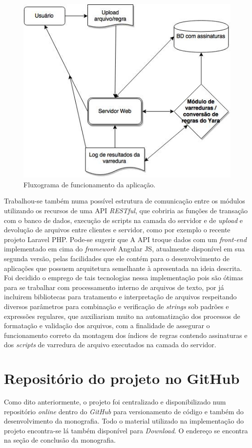 \begin{figure}[H]
  \includegraphics[scale=0.6]{figs/flux_prototipo}
  \centering
  \caption{Fluxograma de funcionamento da aplicação.}
  \label{f.flux_prototipo}
\end{figure}

Trabalhou-se também numa possível estrutura de comunicação entre os módulos
utilizando os recursos de uma API \textit{RESTful}, que cobriria as funções de
transação com o banco de dados, execução de scripts na camada do servidor e de
\textit{upload} e devolução de arquivos entre clientes e servidor, como por
exemplo o recente projeto Laravel PHP. Pode-se sugerir que A API troque dados
com um \textit{front-end} implementado em cima do \textit{framework} Angular JS,
atualmente disponível em sua segunda versão, pelas facilidades que ele contém
para o desenvolvimento de aplicações que possuem arquitetura semelhante à
apresentada na ideia descrita. Foi decidido o emprego de tais tecnologias nessa
implementação pois são ótimas para se trabalhar com processamento interno de
arquivos de texto, por já incluirem bibliotecas para tratamento e interpretação
de arquivos respeitando diversos parâmetros para combinação e verificação de
\textit{strings} sob padrões e expressões regulares, que auxiliariam muito na
automatização dos processos de formatação e validação dos arquivos, com a
finalidade de assegurar o funcionamento correto da montagem dos índices de
regras contendo assinaturas e dos \textit{scripts} de varredura de arquivo
executados na camada do servidor.

\section{Repositório do projeto no GitHub}
\label{s.repositorio}
Como dito anteriormente, o projeto foi centralizado e disponibilizado num
repositório \textit{online} dentro do \textit{GitHub} para versionamento de
código e também do desenvolvimento da monografia. Todo o material utilizado na
implementação do projeto encontra-se lá também disponível para
\textit{Download}. O endereço se encontra na seção de conclusão da monografia.
